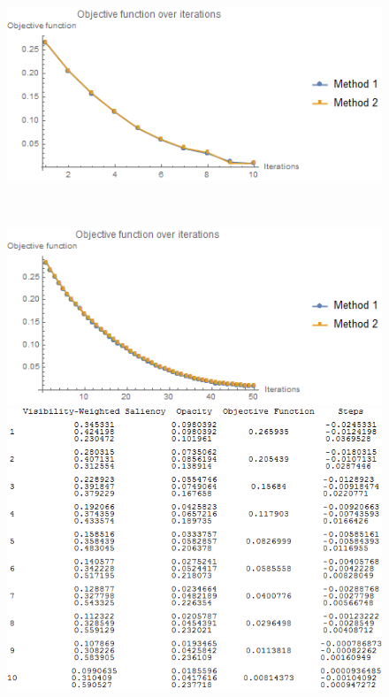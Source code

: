 \begin{figure}
	\centering
	\begin{minipage}{.49\textwidth}
		\includegraphics[width=1\linewidth]{images/nucleon_naive_rms_fixed_newton}
		\subcaption{}
	\end{minipage}~
	\begin{minipage}{.49\textwidth}
		\includegraphics[width=1\linewidth]{images/tooth_naive_rms_fixed_newton}
		\subcaption{}	
	\end{minipage}
	\begin{minipage}{.49\textwidth}
		\includegraphics[width=1\linewidth]{images/nucleon_naive_table_fixed}

\end{minipage}
\end{figure}
